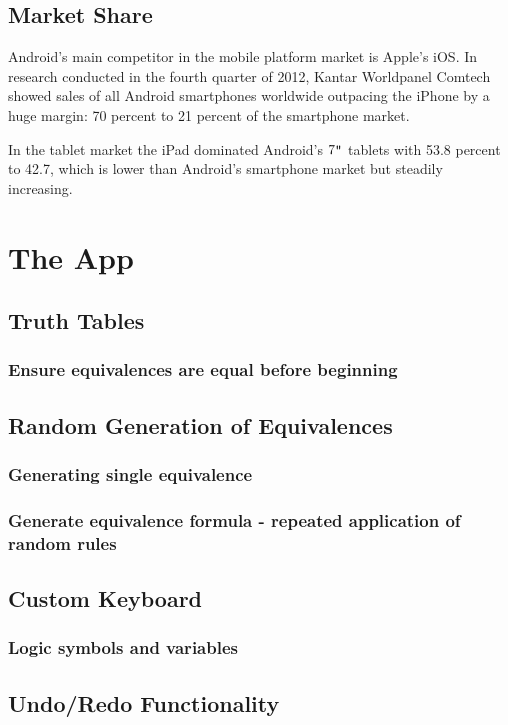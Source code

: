 \documentclass{report}
\begin{document}
\section{Market Share}

Android's main competitor in the mobile platform market is Apple's iOS. In research conducted in the fourth quarter of 2012, Kantar Worldpanel Comtech showed sales of all Android smartphones worldwide outpacing the iPhone by a huge margin: 70 percent to 21 percent of the smartphone market\cite{androidstats}.

In the tablet market the iPad dominated Android's $7\verb+"+$ tablets with 53.8 percent to 42.7, which is lower than Android's smartphone market but steadily increasing.

\chapter{The App}
\section{Truth Tables}
\subsection{Ensure equivalences are equal before beginning}

\section{Random Generation of Equivalences}
\subsection{Generating single equivalence}
\subsection{Generate equivalence formula - repeated application of random rules}

\section{Custom Keyboard}
\subsection{Logic symbols and variables}

\section{Undo/Redo Functionality}
\end{document}

